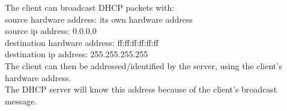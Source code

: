 The client can broadcast DHCP packets with: \\
source hardware address: its own hardware address \\
source ip address: 0.0.0.0 \\

destination hardware address: ff:ff:ff:ff:ff:ff \\
destination ip address: 255.255.255.255 \\

The client can then be addressed/identified by the server, using the client's hardware address. \\
The DHCP server will know this address because of the client's broadcast message. \\
